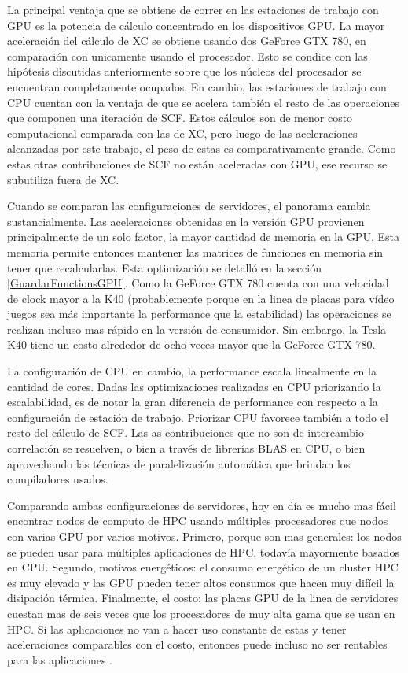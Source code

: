 La principal ventaja que se obtiene de correr en las estaciones de trabajo con GPU es la potencia
de c\'alculo concentrado en los dispositivos GPU. La mayor aceleraci\'on del c\'alculo de XC se obtiene
usando dos GeForce GTX 780, en comparaci\'on con unicamente usando el procesador. Esto se condice con las hip\'otesis discutidas
anteriormente sobre que los n\'ucleos del procesador se encuentran completamente ocupados.
En cambio, las estaciones de trabajo con CPU cuentan con la ventaja de que se acelera tambi\'en el
resto de las operaciones que componen una iteraci\'on de SCF. Estos c\'alculos son de menor costo computacional
comparada con las de XC, pero luego de las aceleraciones alcanzadas por este trabajo, el peso de estas
es comparativamente grande. Como estas otras contribuciones de SCF no est\'an
aceleradas con GPU, ese recurso se subutiliza fuera de XC.

Cuando se comparan las configuraciones de servidores, el panorama cambia sustancialmente.
Las aceleraciones obtenidas en la versi\'on GPU provienen principalmente de un solo factor,
la mayor cantidad de memoria en la GPU. Esta memoria permite entonces mantener las matrices
de funciones en memoria sin tener que recalcularlas. Esta optimizaci\'on se detall\'o en la secci\'on
\ref{GuardarFunctionsGPU}. Como la GeForce GTX 780 cuenta con una velocidad de clock mayor a
la K40 (probablemente porque en la linea de placas para v\'ideo juegos sea m\'as importante
la performance que la estabilidad) las operaciones se realizan incluso mas r\'apido en la
versi\'on de consumidor. Sin embargo, la Tesla K40 tiene un costo alrededor de ocho veces mayor que la
GeForce GTX 780.

La configuraci\'on de CPU en cambio, la performance escala linealmente en la cantidad de cores.
Dadas las optimizaciones realizadas en CPU priorizando la escalabilidad, es de notar la gran
diferencia de performance con respecto a la configuraci\'on de estaci\'on de trabajo. Priorizar CPU
favorece tambi\'en a todo el resto del c\'alculo de SCF. Las as contribuciones que no son
de intercambio-correlaci\'on se resuelven, o bien a trav\'es de librer\'ias BLAS en CPU, o bien
aprovechando las t\'ecnicas de paralelizaci\'on autom\'atica que brindan los compiladores usados.

Comparando ambas configuraciones de servidores, hoy en d\'ia es mucho mas f\'acil encontrar
nodos de computo de HPC usando m\'ultiples procesadores que nodos con varias GPU por varios motivos.
Primero, porque son mas generales: los nodos se pueden usar para m\'ultiples aplicaciones de HPC,
todav\'ia mayormente basados en CPU. Segundo, motivos energ\'eticos: el consumo energ\'etico de un cluster
HPC es muy elevado y las GPU pueden tener altos consumos que hacen muy dif\'icil la disipaci\'on t\'ermica.
Finalmente, el costo: las placas GPU de la linea de servidores cuestan mas de seis veces que los
procesadores de muy alta gama que se usan en HPC. Si las aplicaciones no van a hacer uso constante
de estas y tener aceleraciones comparables con el costo, entonces puede incluso no ser rentables
para las aplicaciones .


